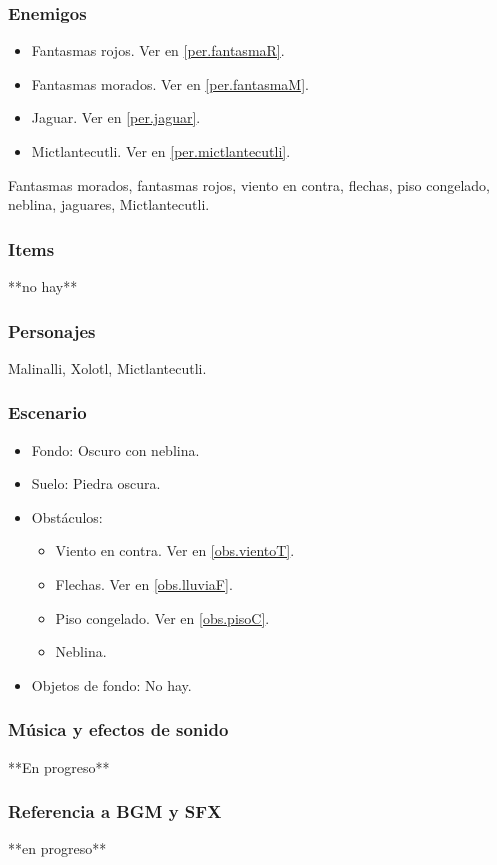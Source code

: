 \documentclass[11pt,letterpaper]{article}
\begin{document}
	\subsubsection{Enemigos}
	\begin{itemize}
		\item Fantasmas rojos. Ver en \ref{per.fantasmaR}.
		\item Fantasmas morados. Ver en \ref{per.fantasmaM}.
		\item Jaguar. Ver en \ref{per.jaguar}.
		\item Mictlantecutli. Ver en \ref{per.mictlantecutli}.
	\end{itemize}
	Fantasmas morados, fantasmas rojos, viento en contra, flechas, piso congelado, neblina, jaguares, Mictlantecutli.
	\subsubsection{Items}
	**no hay**
	\subsubsection{Personajes}
	Malinalli, Xolotl, Mictlantecutli.
	\subsubsection{Escenario}
\begin{itemize} 
	\item Fondo: Oscuro con neblina.
	\item Suelo: Piedra oscura.
	\item Obstáculos:
	\begin{itemize}		
		\item Viento en contra. Ver en \ref{obs.vientoT}.
		\item Flechas. Ver en \ref{obs.lluviaF}.
		\item Piso congelado. Ver en \ref{obs.pisoC}.
		\item Neblina.
	\end{itemize}
	\item Objetos de fondo: No hay.
\end{itemize}	
	\subsubsection{Música y efectos de sonido}
	**En progreso**
	\subsubsection{Referencia a BGM y SFX}
	**en progreso**
\end{document}
